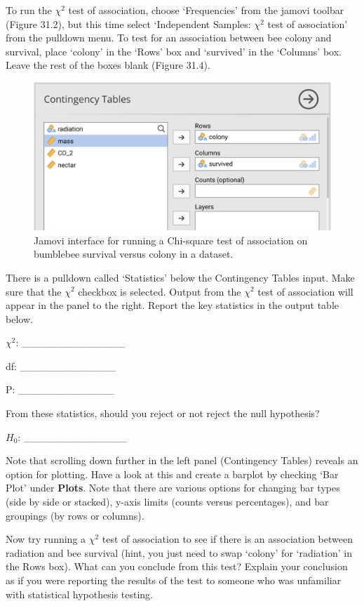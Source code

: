 \documentclass[
]{scrbook}
\begin{document}
To run the \(\chi^{2}\) test of association, choose `Frequencies' from the jamovi toolbar (Figure 31.2), but this time select `Independent Samples: \(\chi^{2}\) test of association' from the pulldown menu.
To test for an association between bee colony and survival, place `colony' in the `Rows' box and `survived' in the `Columns' box.
Leave the rest of the boxes blank (Figure 31.4).

\begin{figure}
\includegraphics[width=1\linewidth]{img/jamovi_test_of_association_interface} \caption{Jamovi interface for running a Chi-square test of association on bumblebee survival versus colony in a dataset.}\label{fig:unnamed-chunk-155}
\end{figure}

There is a pulldown called `Statistics' below the Contingency Tables input.
Make sure that the \(\chi^{2}\) checkbox is selected.
Output from the \(\chi^{2}\) test of association will appear in the panel to the right.
Report the key statistics in the output table below.

\(\chi^{2}\): \_\_\_\_\_\_\_\_\_\_\_\_\_\_

df: \_\_\_\_\_\_\_\_\_\_\_\_\_

P: \_\_\_\_\_\_\_\_\_\_\_\_\_

From these statistics, should you reject or not reject the null hypothesis?

\(H_{0}\): \_\_\_\_\_\_\_\_\_\_\_\_\_\_

Note that scrolling down further in the left panel (Contingency Tables) reveals an option for plotting.
Have a look at this and create a barplot by checking `Bar Plot' under \textbf{Plots}.
Note that there are various options for changing bar types (side by side or stacked), y-axis limits (counts versus percentages), and bar groupings (by rows or columns).

Now try running a \(\chi^{2}\) test of association to see if there is an association between radiation and bee survival (hint, you just need to swap `colony' for `radiation' in the Rows box).
What can you conclude from this test?
Explain your conclusion as if you were reporting the results of the test to someone who was unfamiliar with statistical hypothesis testing.
\end{document}
